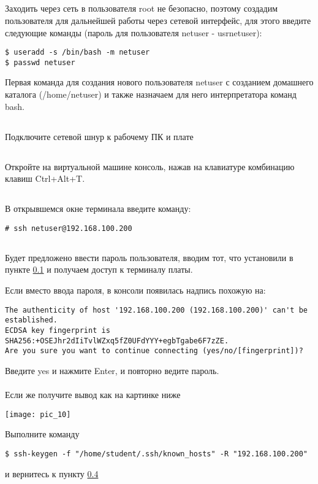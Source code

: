 \subsection{}\label{lab2:ref1}Заходить через сеть в пользователя root не безопасно, поэтому создадим пользователя для дальнейшей работы через сетевой интерфейс, для этого введите следующие команды (пароль для пользователя netuser - usrnetuser):
\begin{lstlisting}[style=bash]
$ useradd -s /bin/bash -m netuser
$ passwd netuser
\end{lstlisting}

Первая команда для создания нового пользователя netuser с созданием домашнего каталога (/home/netuser) и также назначаем для него интерпретатора команд bash. 

\subsection{}Подключите сетевой шнур к рабочему ПК и плате

\subsection{}Откройте на виртуальной машине консоль, нажав на клавиатуре комбинацию клавиш Ctrl+Alt+T. 

\subsection{}\label{lab2:ref2}В открывшемся окне терминала введите команду: 
\begin{lstlisting}[style=bash]
# ssh netuser@192.168.100.200
\end{lstlisting}

\subsection{}Будет предложено ввести пароль пользователя, вводим тот, что установили в пункте \ref{lab2:ref1} и получаем доступ к терминалу платы.

Если вместо ввода пароля, в консоли появилась надпись похожую на:
\begin{lstlisting}[style=stdout]
The authenticity of host '192.168.100.200 (192.168.100.200)' can't be established.
ECDSA key fingerprint is SHA256:+OSEJhr2dIiTvlWZxq5fZ0UFdYYY+egbTgabe6F7zZE.
Are you sure you want to continue connecting (yes/no/[fingerprint])?
\end{lstlisting}
Введите yes и нажмите Enter, и повторно ведите пароль.
\\\\
Если же получите вывод как на картинке ниже
\begin{center}
	\texttt{[image: pic\_10]}
\end{center}
Выполните команду 
\begin{lstlisting}[style=bash]
$ ssh-keygen -f "/home/student/.ssh/known_hosts" -R "192.168.100.200"
\end{lstlisting}
и вернитесь к пункту \ref{lab2:ref2}

